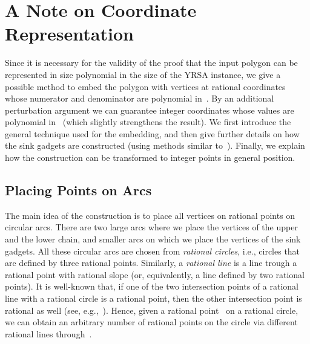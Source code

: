 \documentclass[a4paper,11pt]{article}
\begin{document}



\newpage
\appendix


\section{A Note on Coordinate Representation}\label{apx_coordinates}
Since it is necessary for the validity of the proof that the input polygon can be represented in size polynomial in the size of the YRSA instance, we give a possible method to embed the polygon with vertices at rational coordinates whose numerator and denominator are polynomial in~.
By an additional perturbation argument we can guarantee integer coordinates whose values are polynomial in~ (which slightly strengthens the result).
We first introduce the general technique used for the embedding, and then give further details on how the sink gadgets are constructed (using methods similar to~\cite{point_set_hard}).
Finally, we explain how the construction can be transformed to integer points in general position.

\subsection{Placing Points on Arcs}

The main idea of the construction is to place all vertices on rational points on circular arcs.
There are two large arcs where we place the vertices of the upper and the lower chain, and smaller arcs on which we place the vertices of the sink gadgets.
All these circular arcs are chosen from \emph{rational circles}, i.e., circles that are defined by three rational points.
Similarly, a \emph{rational line} is a line trough a rational point with rational slope (or, equivalently, a line defined by two rational points).
It is well-known that, if one of the two intersection points of a rational line with a rational circle is a rational point, then the other intersection point is rational as well (see, e.g.,~\cite[p.~5]{husemoeller}).
Hence, given a rational point~ on a rational circle, we can obtain an arbitrary number of rational points on the circle via different rational lines through~.
\end{document}
